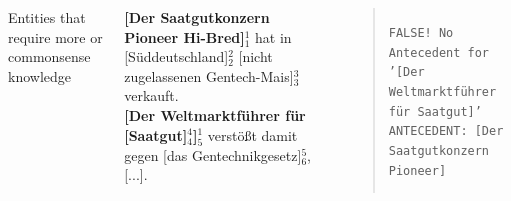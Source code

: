\documentclass[25pt, a0paper, portrait, margin=10mm, innermargin=15mm,
blockverticalspace=15mm, colspace=15mm, subcolspace=8mm]{tikzposter}
\begin{document}
\begin{columns}
{


\innerblock
{Entities that require more or commonsense knowledge}
{\textbf{[Der Saatgutkonzern Pioneer Hi-Bred]}$^{1}_{1}$ hat in [Süddeutschland]$^{2}_{2}$ [nicht zugelassenen Gentech-Mais]$^{3}_{3}$ verkauft.\\\textbf{[Der Weltmarktführer für [Saatgut]$^{4}_{4}$]}$^{1}_{5}$ verstößt damit gegen [das Gentechnikgesetz]$^{5}_{6}$, [...].
\begin{quote}
\texttt{FALSE! No Antecedent for '[Der Weltmarktführer für Saatgut]'\\ANTECEDENT: [Der Saatgutkonzern Pioneer]}
\end{quote}}
} 


%





\end{columns}
\end{document}
